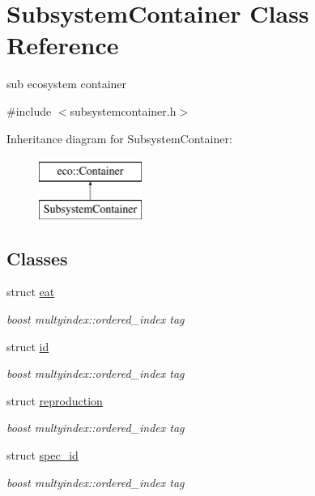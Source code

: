 \hypertarget{classSubsystemContainer}{
\section{SubsystemContainer Class Reference}
\label{classSubsystemContainer}
}


sub ecosystem container  




{\ttfamily \#include $<$subsystemcontainer.h$>$}

Inheritance diagram for SubsystemContainer:\begin{figure}[H]
\begin{center}
\leavevmode
\includegraphics[height=2.000000cm]{classSubsystemContainer}
\end{center}
\end{figure}
\subsection*{Classes}
\begin{DoxyCompactItemize}
\item 
struct \hyperlink{structSubsystemContainer_1_1eat}{eat}
\begin{DoxyCompactList}\small\item\em boost multyindex::ordered\_\-index tag \end{DoxyCompactList}\item 
struct \hyperlink{structSubsystemContainer_1_1id}{id}
\begin{DoxyCompactList}\small\item\em boost multyindex::ordered\_\-index tag \end{DoxyCompactList}\item 
struct \hyperlink{structSubsystemContainer_1_1reproduction}{reproduction}
\begin{DoxyCompactList}\small\item\em boost multyindex::ordered\_\-index tag \end{DoxyCompactList}\item 
struct \hyperlink{structSubsystemContainer_1_1spec__id}{spec\_\-id}
\begin{DoxyCompactList}\small\item\em boost multyindex::ordered\_\-index tag \end{DoxyCompactList}\end{DoxyCompactItemize}
